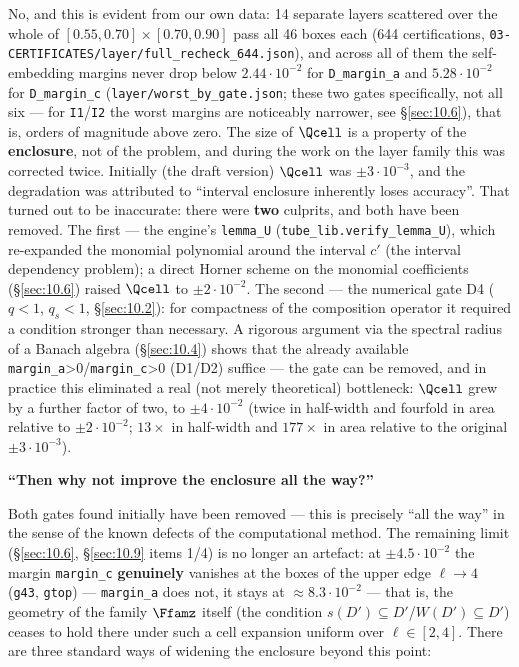 No, and this is evident from our own data: 14 separate layers scattered over the whole of $[0.55, 0.70] \times [0.70, 0.90]$ pass all 46 boxes each (644 certifications, \texttt{03-\allowbreak CERTIFICATES/\allowbreak layer/\allowbreak full\_\allowbreak recheck\_\allowbreak 644.json}), and across all of them the self-embedding margins never drop below $2.44 \cdot 10^{-2}$ for \texttt{D\_margin\_a} and $5.28 \cdot 10^{-2}$ for \texttt{D\_margin\_c} (\texttt{layer/\allowbreak worst\_\allowbreak by\_\allowbreak gate.json}; these two gates specifically, not all six --- for \texttt{I1}/\texttt{I2} the worst margins are noticeably narrower, see \S\ref{sec:10.6}), that is, orders of magnitude above zero. The size of $\Qcell$ is a property of the \textbf{enclosure}, not of the problem, and
during the work on the layer family this was corrected twice. Initially (the draft
version) $\Qcell$ was $\pm 3\cdot 10^{-3}$, and the degradation was attributed to ``interval
enclosure inherently loses accuracy''. That turned out to be inaccurate: there
were \textbf{two} culprits, and both have been removed. The first --- the engine's
\texttt{lemma\_U} (\texttt{tube\_\allowbreak lib.verify\_\allowbreak lemma\_\allowbreak U}), which re-expanded the monomial
polynomial around the interval $c'$ (the interval dependency problem); a
direct Horner scheme on the monomial coefficients (\S\ref{sec:10.6}) raised $\Qcell$ to
$\pm 2\cdot 10^{-2}$. The second --- the numerical gate D4 ($q<1$, $q_s<1$, \S\ref{sec:10.2}): for
compactness of the composition operator it required a condition stronger than
necessary. A rigorous argument via the spectral radius of a Banach algebra
(\S\ref{sec:10.4}) shows that the already available \texttt{margin\_a}>0/\texttt{margin\_c}>0 (D1/D2)
suffice --- the gate can be removed, and in practice this eliminated a real
(not merely theoretical) bottleneck: $\Qcell$ grew by a further factor of two, to
$\pm 4\cdot 10^{-2}$ (twice in half-width and fourfold in area relative to
$\pm 2\cdot 10^{-2}$; $13\times$ in half-width and $177\times$ in area relative to the
original $\pm 3\cdot 10^{-3}$).

\textbf{``Then why not improve the enclosure all the way?''}

Both gates found initially have been removed --- this is precisely ``all the
way'' in the sense of the known defects of the computational method. The
remaining limit (\S\ref{sec:10.6}, \S\ref{sec:10.9} items 1/4) is no longer an artefact: at
$\pm 4.5\cdot 10^{-2}$ the margin \texttt{margin\_c} \textbf{genuinely} vanishes at the
boxes of the upper edge $\ell \to 4$ (\texttt{g43}, \texttt{gtop}) --- \texttt{margin\_a}
does not, it stays at $\approx 8.3\cdot 10^{-2}$ --- that is, the geometry of the
family $\Ffamz$ itself (the condition $s(D')\subseteq D'$/$W(D')\subseteq D'$) ceases to hold there
under such a cell expansion uniform over $\ell \in [2,4]$. There are three standard
ways of widening the enclosure beyond this point:

